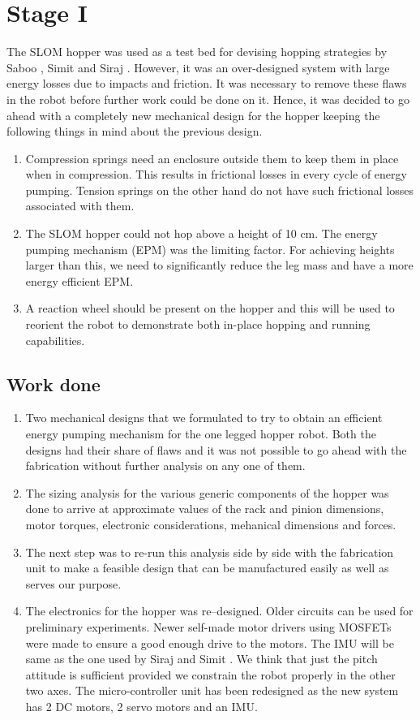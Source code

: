 \section{Stage I}
The SLOM hopper was used as a test bed for devising hopping strategies by Saboo \cite{saboo}, Simit \cite{simit} and Siraj \cite{siraj}. However, it was an over-designed system with large energy losses due to impacts and friction. It was necessary to remove these flaws in the robot before further work could be done on it. Hence, it was decided to go ahead with a completely new mechanical design for the hopper keeping the following things in mind about the previous design.
\begin{enumerate}
\item
Compression springs need an enclosure outside them to keep them in place when in compression. This results in frictional losses in every cycle of energy pumping. Tension springs on the other hand do not have such frictional losses associated with them.
\item
The SLOM hopper could not hop above a height of 10 cm. The energy pumping mechanism (EPM) was the limiting factor. For achieving heights larger than this, we need to significantly reduce the leg mass and have a more energy efficient EPM.
\item
A reaction wheel should be present on the hopper and this will be used to reorient the robot to demonstrate both in-place hopping
and running capabilities.
\end{enumerate}

\subsection*{Work done}
\begin{enumerate}
 \item 
Two mechanical designs that we formulated to try to obtain an efficient energy pumping mechanism for
the one legged hopper robot. Both the designs had their share of flaws and it was not possible to go ahead with the fabrication without further analysis on any one of them.
\item
The sizing analysis for the various generic components of the hopper was done to arrive at approximate values of the rack and pinion dimensions, motor torques, electronic considerations, mehanical dimensions and forces.
\item
The next step was to re-run this analysis side by side with the fabrication unit to make a feasible design that can be manufactured easily as well as serves our purpose.
\item
The electronics for the hopper was re--designed. Older circuits can be used for preliminary experiments. Newer self-made motor drivers using MOSFETs were made to ensure a good enough drive to the motors. The IMU will be same as the one used by Siraj and Simit \cite{siraj, simit}. We think that just the pitch attitude is sufficient provided we constrain the robot properly in the other two axes. The micro-controller unit has been redesigned as the new system has 2 DC motors, 2 servo motors and an IMU.
\end{enumerate}

